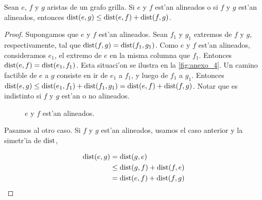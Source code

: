 \begin{lemma}
\label{le:dist_triangle_inequality_2}
Sean $e$, $f$ y $g$ aristas de un grafo grilla. Si $e$ y $f$ est'an alineados o si $f$ y $g$ est'an alineados, entonces $\textnormal{dist}(e, g) \leq \textnormal{dist}(e, f) + \textnormal{dist}(f, g)$.

\begin{proof}
Supongamos que $e$ y $f$ est'an alineados. Sean $f_1$ y $g_1$ extremos de $f$ y $g$, respectivamente, tal que $\textnormal{dist}(f, g) = \textnormal{dist}(f_1, g_1)$. Como $e$ y $f$ est'an alineados, consideramos $e_1$, el extremo de $e$ en la misma columna que $f_1$. Entonces $\textnormal{dist}(e, f) = \textnormal{dist}(e_1, f_1)$. Esta situaci'on se ilustra en la \autoref{fig:anexo_4}. Un camino factible de $e$ a $g$ consiste en ir de $e_1$ a $f_1$, y luego de $f_1$ a $g_1$. Entonces $\textnormal{dist}(e, g) \leq \textnormal{dist}(e_1, f_1) + \textnormal{dist}(f_1, g_1) = \textnormal{dist}(e, f) + \textnormal{dist}(f, g)$. Notar que es indistinto si $f$ y $g$ est'an o no alineados.

\begin{figure}[h]
	\begin{center}
		
	\end{center}		
	\caption{$e$ y $f$ est'an alineados.}
	\label{fig:anexo_4}
\end{figure}

Pasamos al otro caso. Si $f$ y $g$ est'an alineados, usamos el caso anterior y la simetr'ia de $\textnormal{dist}$,

\begin{align*}
\textnormal{dist}(e, g) &= \textnormal{dist}(g, e)\\
&\leq \textnormal{dist}(g, f) + \textnormal{dist}(f, e)\\
&= \textnormal{dist}(e, f) + \textnormal{dist}(f, g)
\end{align*}

\end{proof}
\end{lemma}

